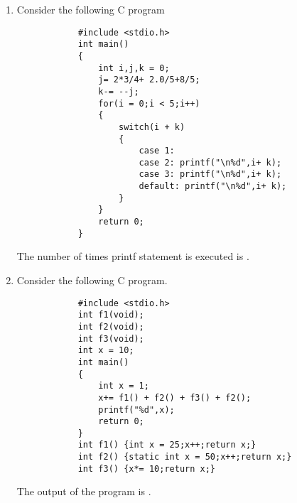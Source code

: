\documentclass[journal,12pt,onecolumn]{IEEEtran}
\theoremstyle{remark}
\begin{document}
\begin{enumerate}
		\hfill{}
		
		\begin{enumerate}
		\end{enumerate}
		
		\item Consider the following C program
		\begin{verbatim}
			#include <stdio.h>
			int main()
			{
				int i,j,k = 0;
				j= 2*3/4+ 2.0/5+8/5;
				k-= --j;
				for(i = 0;i < 5;i++)
				{
					switch(i + k)
					{
						case 1:
						case 2: printf("\n%d",i+ k);
						case 3: printf("\n%d",i+ k);
						default: printf("\n%d",i+ k);
					}
				}
				return 0;
			}
		\end{verbatim}
		The number of times printf statement is executed is \underline{\hspace{2cm}}.
		
		\hfill{}
		
		\item Consider the following C program.
		\begin{verbatim}
			#include <stdio.h>
			int f1(void);
			int f2(void);
			int f3(void);
			int x = 10;
			int main()
			{
				int x = 1;
				x+= f1() + f2() + f3() + f2();
				printf("%d",x);
				return 0;
			}
			int f1() {int x = 25;x++;return x;}
			int f2() {static int x = 50;x++;return x;}
			int f3() {x*= 10;return x;}
		\end{verbatim}
		The output of the program is \underline{\hspace{2cm}}.
		
		\hfill{}
		

\end{enumerate}
\end{document}
